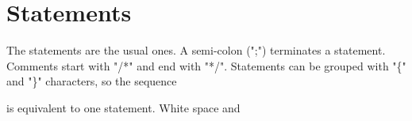 \section{Statements}
\par
The statements are the usual ones. A semi-colon (";") terminates a %
statement. Comments start with "/*" and end with "*/". Statements can %
be grouped with "\{" and "\}" characters, so the sequence %
\par
\addvspace{\medskipamount} %
\par
\noindent{\tt %
\footnotesize %
\verb_        _\{\ \\
\verb_        _<statement~1>\ \\
\verb_        _<statement~1>\ \\
\verb_                _...\ \\
\verb_        _<statement~n>\ \\
\verb_        _\} %
} %
\par
\addvspace{\medskipamount} is equivalent to one statement. White space %
and
